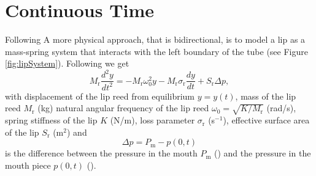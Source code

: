 \section{Continuous Time}
Following A more physical approach, that is bidirectional, is to model a lip as a mass-spring system that interacts with the left boundary of the tube (see Figure \ref{fig:lipSystem}). Following \cite{Harrison2018} we get
\begin{equation}
    M_\text{r}\frac{d^2y}{dt^2} = -M_\text{r} \omega_0^2 y - M_\text{r} \sigma_\text{r} \frac{dy}{dt} + S_\text{r}\Delta p,
\end{equation}
with displacement of the lip reed from equilibrium $y = y(t)$, mass of the lip reed $M_\text{r}$ (kg) natural angular frequency of the lip reed $\omega_0 = \sqrt{K/M_\text{r}}$ (rad/s), spring stiffness of the lip $K$ (N/m), loss parameter $\sigma_\text{r}$ (s$^{-1}$), effective surface area of the lip $S_\text{r}$ (m$^2$) and 
\begin{equation}
    \Delta p = P_\text{m} - p(0,t)
\end{equation}
is the difference between the pressure in the mouth $P_\text{m}$ (\SWcomment[kPa]) and the pressure in the mouth piece $p(0,t)$ (\SWcomment[kPa]). 
